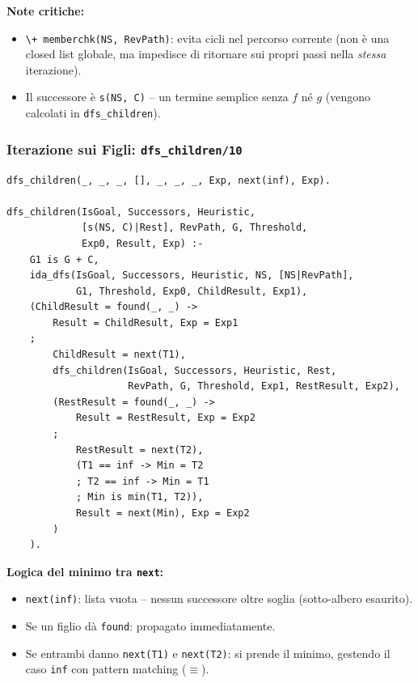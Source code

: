 \documentclass[12pt,a4paper]{article}
\begin{document}
\noindent\textbf{Note critiche:}
\begin{itemize}[noitemsep]
  \item \texttt{\textbackslash+ memberchk(NS, RevPath)}: evita cicli nel percorso corrente
        (non è una closed list globale, ma impedisce di ritornare sui propri passi
        nella \emph{stessa} iterazione).
  \item Il successore è \texttt{s(NS, C)} -- un termine semplice senza $f$ né $g$
        (vengono calcolati in \texttt{dfs\_children}).
\end{itemize}

\subsubsection{Iterazione sui Figli: \texttt{dfs\_children/10}}

\begin{lstlisting}
dfs_children(_, _, _, [], _, _, _, Exp, next(inf), Exp).

dfs_children(IsGoal, Successors, Heuristic,
             [s(NS, C)|Rest], RevPath, G, Threshold,
             Exp0, Result, Exp) :-
    G1 is G + C,
    ida_dfs(IsGoal, Successors, Heuristic, NS, [NS|RevPath],
            G1, Threshold, Exp0, ChildResult, Exp1),
    (ChildResult = found(_, _) ->
        Result = ChildResult, Exp = Exp1
    ;
        ChildResult = next(T1),
        dfs_children(IsGoal, Successors, Heuristic, Rest,
                     RevPath, G, Threshold, Exp1, RestResult, Exp2),
        (RestResult = found(_, _) ->
            Result = RestResult, Exp = Exp2
        ;
            RestResult = next(T2),
            (T1 == inf -> Min = T2
            ; T2 == inf -> Min = T1
            ; Min is min(T1, T2)),
            Result = next(Min), Exp = Exp2
        )
    ).
\end{lstlisting}

\noindent\textbf{Logica del minimo tra \texttt{next}:}
\begin{itemize}[noitemsep]
  \item \texttt{next(inf)}: lista vuota -- nessun successore oltre soglia (sotto-albero esaurito).
  \item Se un figlio dà \texttt{found}: propagato immediatamente.
  \item Se entrambi danno \texttt{next(T1)} e \texttt{next(T2)}: si prende il minimo,
        gestendo il caso \texttt{inf} con pattern matching ($\equiv$).
\end{itemize}
\end{document}
